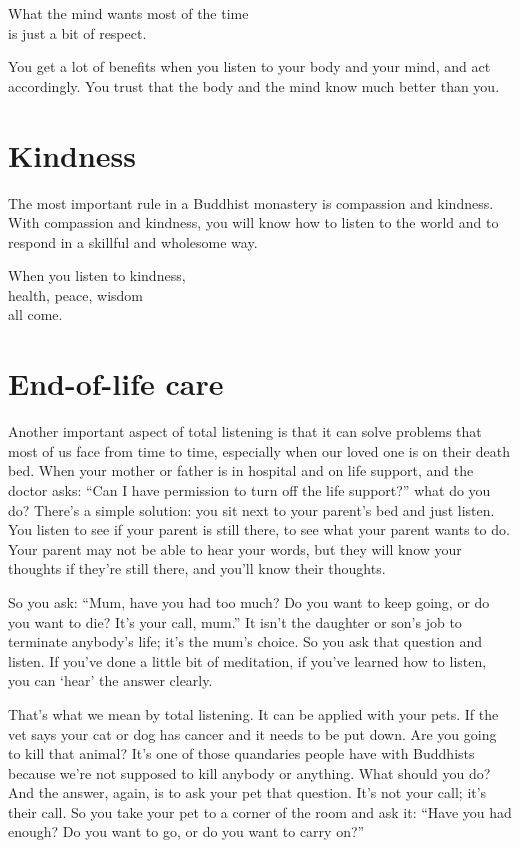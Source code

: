 \documentclass[12pt, openany]{book}
\newenvironment{aphorism}%
{%
\begin{center}\begin{itshape}
}%
{\end{itshape}\end{center}
}%
\begin{document}
\begin{aphorism}
What the mind wants most of the time\\  
is just a bit of respect.
\end{aphorism}

You get a lot of benefits when you listen to your body and your mind, and act accordingly. You trust that the body and the mind know much better than you. 

\section*{Kindness}

The most important rule in a Buddhist monastery is compassion and kindness. With compassion and kindness, you will know how to listen to the world and to respond in a skillful and wholesome way. 

\begin{aphorism}
When you listen to kindness,\\  
health, peace, wisdom\\ 
all come.
\end{aphorism}

\section*{End-of-life care}

Another important aspect of total listening is that it can solve problems that most of us face from time to time, especially when our loved one is on their death bed. When your mother or father is in hospital and on life support, and the doctor asks: “Can I have permission to turn off the life support?” what do you do? There’s a simple solution: you sit next to your parent’s bed and just listen. You listen to see if your parent is still there, to see what your parent wants to do. Your parent may not be able to hear your words, but they will know your thoughts if they’re still there, and you’ll know their thoughts. 

So you ask: “Mum, have you had too much? Do you want to keep going, or do you want to die? It’s your call, mum.” It isn’t the daughter or son’s job to terminate anybody’s life; it’s the mum’s choice. So you ask that question and listen. If you’ve done a little bit of meditation, if you’ve learned how to listen, you can ‘hear’ the answer clearly. 

That’s what we mean by total listening. It can be applied with your pets. If the vet says your cat or dog has cancer and it needs to be put down. Are you going to kill that animal? It’s one of those quandaries people have with Buddhists because we’re not supposed to kill anybody or anything. What should you do? And the answer, again, is to ask your pet that question. It’s not your call; it’s their call. So you take your pet to a corner of the room and ask it: “Have you had enough? Do you want to go, or do you want to carry on?” 
\end{document}
